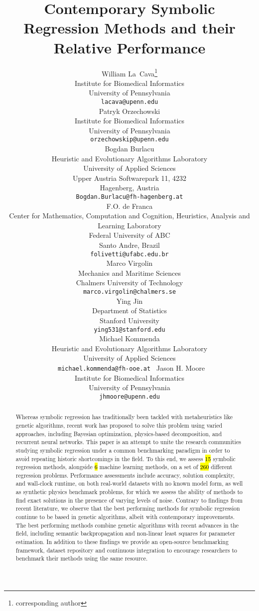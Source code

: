 \documentclass{article}
\title{Contemporary Symbolic Regression Methods and their Relative Performance}
\author{%
        William La~Cava\footnote{corresponding author} \\
        Institute for Biomedical Informatics\\
        University of Pennsylvania\\
        \texttt{lacava@upenn.edu} \\
        \And
        Patryk Orzechowski \\
        Institute for Biomedical Informatics\\
        University of Pennsylvania\\
        \texttt{orzechowskip@upenn.edu} \\
        \And
        Bogdan Burlacu \\
        Heuristic and Evolutionary Algorithms Laboratory \\
        University of Applied Sciences \\ 
        Upper Austria Softwarepark 11, 4232 \\
        Hagenberg, Austria \\
        \texttt{Bogdan.Burlacu@fh-hagenberg.at} \\
        \And
        F.O. de Franca \\
        Center for Mathematics, Computation and Cognition, Heuristics, Analysis and Learning Laboratory \\
        Federal University of ABC \\
        Santo Andre, Brazil \\
        \texttt{folivetti@ufabc.edu.br} \\
        \And
        Marco Virgolin \\
        Mechanics and Maritime Sciences \\
        Chalmers University of Technology \\
        \texttt{ marco.virgolin@chalmers.se } \\
        \And
        Ying Jin \\
        Department of Statistics \\
        Stanford University \\ 
        \texttt{ying531@stanford.edu} \\
        \And
        Michael Kommenda  \\
        Heuristic and Evolutionary Algorithms Laboratory \\
        University of Applied Sciences \\ 
        \texttt{ michael.kommenda@fh-ooe.at }
        \And
        Jason H. Moore \\ 
        Institute for Biomedical Informatics\\
        University of Pennsylvania \\
        \texttt{ jhmoore@upenn.edu } \\
}
\begin{document}
\maketitle

\begin{abstract}
    Whereas symbolic regression has traditionally been tackled with metaheuristics like genetic algorithms, recent work has proposed to solve this problem using varied approaches, including Bayesian optimization, physics-based decomposition, and recurrent neural networks. 
    This paper is an attempt to unite the research communities studying symbolic regression under a common benchmarking paradigm in order to avoid repeating historic shortcomings in the field. 
    To this end, we assess \hl{15} symbolic regression methods, alongside \hl{6} machine learning methods, on a set of \hl{260} different regression problems.
    Performance assessments include accuracy, solution complexity, and wall-clock runtime, on both real-world datasets with no known model form, as well as synthetic physics benchmark problems, for which we assess the ability of methods to find exact solutions in the presence of varying levels of noise. 
    Contrary to findings from recent literature, we observe that the best performing methods for symbolic regression continue to be based in genetic algorithms, albeit with contemporary improvements. 
    The best performing methods combine genetic algorithms with recent advances in the field, including semantic backpropagation and non-linear least squares for parameter estimation.
    In addition to these findings we provide an open-source benchmarking framework, dataset repository and continuous integration to encourage researchers to benchmark their methods using the same resource.
\end{abstract}






\end{document}

